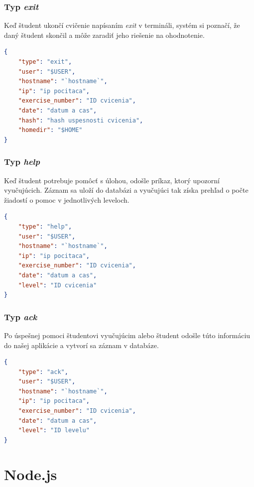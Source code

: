 \subsubsection{Typ \textit{exit}}
\label{sec:zbieraniedat:exit}

Keď študent ukončí cvičenie napísaním \textit{exit} v termináli,
systém si poznačí, že daný študent skončil a môže zaradiť jeho riešenie
na ohodnotenie.

\begin{lstlisting}[language=json,firstnumber=1]
{
    "type": "exit",
    "user": "$USER",
    "hostname": "`hostname`",
    "ip": "ip pocitaca",
    "exercise_number": "ID cvicenia",
    "date": "datum a cas",
    "hash": "hash uspesnosti cvicenia",
    "homedir": "$HOME"
}
\end{lstlisting}

\subsubsection{Typ \textit{help}}
\label{sec:zbieraniedat:help}

Keď študent potrebuje pomôcť s úlohou, odošle príkaz, ktorý upozorní vyučujúcich.
Záznam sa uloží do databázi a vyučujúci tak získa prehľad o počte žiadostí
o pomoc v jednotlivých leveloch.

\begin{lstlisting}[language=json,firstnumber=1]
{
    "type": "help",
    "user": "$USER",
    "hostname": "`hostname`",
    "ip": "ip pocitaca",
    "exercise_number": "ID cvicenia",
    "date": "datum a cas",
    "level": "ID cvicenia"
}
\end{lstlisting}

\subsubsection{Typ \textit{ack}}
\label{sec:zbieraniedat:ack}

Po úspešnej pomoci študentovi vyučujúcim alebo študent odošle túto informáciu
do našej aplikácie a vytvorí sa záznam v databáze.

\begin{lstlisting}[language=json,firstnumber=1]
{
    "type": "ack",
    "user": "$USER",
    "hostname": "`hostname`",
    "ip": "ip pocitaca",
    "exercise_number": "ID cvicenia",
    "date": "datum a cas",
    "level": "ID levelu"
}
\end{lstlisting}

\section{Node.js}
\label{sec:nodejs}


